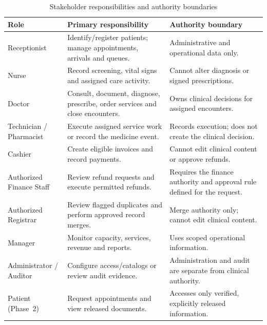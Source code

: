 \documentclass[a4paper,12pt]{article}
\begin{document}
\begin{table}[H]
\centering
\small
\renewcommand{\arraystretch}{1.15}
\begin{tabularx}{\textwidth}{@{}P{0.22\textwidth}P{0.39\textwidth}Y@{}}
\toprule
Role & Primary responsibility & Authority boundary \\
\midrule
Receptionist & Identify/register patients; manage appointments, arrivals and queues. & Administrative and operational data only. \\
Nurse & Record screening, vital signs and assigned care activity. & Cannot alter diagnosis or signed prescriptions. \\
Doctor & Consult, document, diagnose, prescribe, order services and close encounters. & Owns clinical decisions for assigned encounters. \\
Technician / Pharmacist & Execute assigned service work or record the medicine event. & Records execution; does not create the clinical decision. \\
Cashier & Create eligible invoices and record payments. & Cannot edit clinical content or approve refunds. \\
Authorized Finance Staff & Review refund requests and execute permitted refunds. & Requires the finance authority and approval rule defined for the request. \\
Authorized Registrar & Review flagged duplicates and perform approved record merges. & Merge authority only; cannot edit clinical content. \\
Manager & Monitor capacity, services, revenue and reports. & Uses scoped operational information. \\
Administrator / Auditor & Configure access/catalogs or review audit evidence. & Administration and audit are separate from clinical authority. \\
Patient (Phase~2) & Request appointments and view released documents. & Accesses only verified, explicitly released information. \\
\bottomrule
\end{tabularx}
\caption{Stakeholder responsibilities and authority boundaries}
\label{tab:stakeholder-summary}
\end{table}
\end{document}
